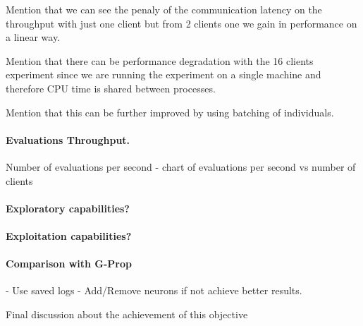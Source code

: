 Mention that we can see the penaly of the communication latency on the throughput with just one client but from 2 clients one we gain in performance on a linear way.

Mention that there can be performance degradation with the 16 clients experiment since we are running the experiment on a single machine and therefore CPU time is shared between processes.

Mention that this can be further improved by using batching of individuals.


\paragraph*{Evaluations Throughput.} Number of evaluations per second - chart of evaluations per second vs number of clients
\paragraph*{Exploratory capabilities?}
\paragraph*{Exploitation capabilities?}
\paragraph*{Comparison with G-Prop} - Use saved logs - Add/Remove neurons if not achieve better results.

Final discussion about the achievement of this objective